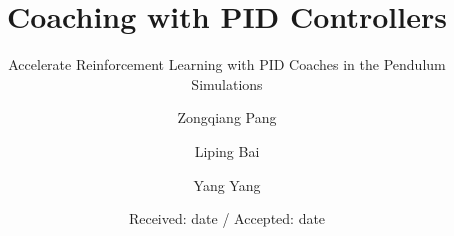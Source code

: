 \usepackage[numbers,sort&compress]{natbib}
\usepackage{graphicx}
%
%
%
%
%


\title{Coaching with PID Controllers %
}
\subtitle{Accelerate Reinforcement Learning with PID Coaches in the Pendulum Simulations}


\author{Zongqiang Pang\and
Liping Bai \and
Yang Yang}





\date{Received: date / Accepted: date}


\maketitle

